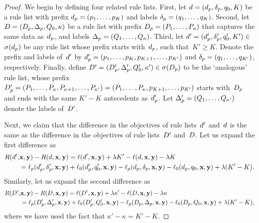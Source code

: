 \begin{arxiv}
\begin{proof}
We begin by defining four related rule lists.
%
First, let ${{d} = (d_p, \delta_p, q_0, K)}$
be a rule list with prefix ${d_p = (p_1, \dots, p_K)}$
and labels ${\delta_p = (q_1, \dots, q_K)}$.
%
Second, let ${{D} = (D_p, \Delta_p, Q_0, \kappa)}$
be a rule list with prefix ${D_p = (P_1, \dots, P_\kappa)}$
that captures the same data as~$d_p$,
and labels ${\Delta_p = (Q_1, \dots, Q_\kappa)}$.
%
Third, let ${{d}' = (d_p', \delta_p', q_0', K') \in}$
${\sigma(d_p)}$ be any rule list
whose prefix starts with~$d_p$, such that~${K' \ge K}$.
%
Denote the prefix and labels of~${d}'$ by
${d_p' = (p_1, \dots, p_K, p_{K+1}, \dots, p_{K'})}$
and ${\delta_p = (q_1, \dots, q_{K'})}$, respectively.
%
Finally, define
${{D}' = (D_p', \Delta_p', Q_0', \kappa') \in \sigma(D_p)}$
to be the `analogous' rule list, \ie whose prefix
${D_p' = (P_1, \dots, P_\kappa, P_{\kappa+1}, \dots, P_{\kappa'})
= (P_1, \dots, P_\kappa, p_{K+1}, \dots, p_{K'})}$
starts with~$D_p$ and ends with the same ${K'-K}$
antecedents as~$d_p'$.
%
Let ${\Delta_p' = (Q_1, \dots, Q_{\kappa'})}$
denote the labels of~${D}'$.

Next, we claim that the difference in the objectives
of rule lists~${d}'$ and~${d}$ is the same as the difference
in the objectives of rule lists~${D}'$ and~${D}$.
%
Let us expand the first difference as
\begin{align}
R({d}',& \mathbf{x}, \mathbf{y}) - R({d}, \mathbf{x}, \mathbf{y})
  = \ell({d}', \mathbf{x}, \mathbf{y}) + {\lambda} K' - \ell({d}, \mathbf{x}, \mathbf{y}) - {\lambda} K \nonumber \\
&= \ell_p(d_p', \delta_p', \mathbf{x}, \mathbf{y}) + \ell_0(d_p', q_0', \mathbf{x}, \mathbf{y})
  - \ell_p(d_p, \delta_p, \mathbf{x}, \mathbf{y}) - \ell_0(d_p, q_0, \mathbf{x}, \mathbf{y})
  + {\lambda} (K' - K).
\end{align}
Similarly, let us expand the second difference as
\begin{align}
R({D}',& \mathbf{x}, \mathbf{y}) - R({D}, \mathbf{x}, \mathbf{y})
  = \ell({D}', \mathbf{x}, \mathbf{y}) + {\lambda} \kappa' - \ell({D}, \mathbf{x}, \mathbf{y}) - {\lambda} \kappa \nonumber \\
&= \ell_p(D_p', \Delta_p', \mathbf{x}, \mathbf{y}) + \ell_0(D_p', Q_0', \mathbf{x}, \mathbf{y})
  - \ell_p(D_p, \Delta_p, \mathbf{x}, \mathbf{y}) - \ell_0(D_p, Q_0, \mathbf{x}, \mathbf{y})
  + {\lambda} (K' - K),
\end{align}
where we have used the fact that ${\kappa' - \kappa = K' - K}$.


\end{proof}
\end{arxiv}
